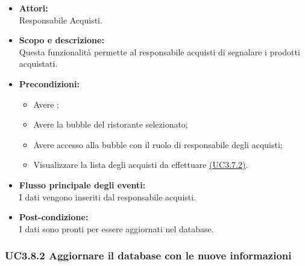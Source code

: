\begin{itemize}
	\item \textbf{Attori:}
	\\Responsabile Acquisti.
	\item \textbf{Scopo e descrizione:} 
	\\Questa funzionalità permette al responsabile acquisti di segnalare i prodotti acquistati.
	\item \textbf{Precondizioni:}
	\begin{itemize}
		\item Avere ;
		\item Avere la bubble del ristorante selezionato;
		\item Avere accesso alla bubble con il ruolo di responsabile degli acquisti;
		\item Visualizzare la lista degli acquisti da effettuare \hyperref[UC3.7.2]{(UC3.7.2)}.
	\end{itemize}
	\item \textbf{Flusso principale degli eventi:}
	\\I dati vengono inseriti dal responsabile acquisti.
	\item \textbf{Post-condizione:}
	\\I dati sono pronti per essere aggiornati nel database.
\end{itemize}

\subsubsection{UC3.8.2 Aggiornare il database con le nuove informazioni} \label{UC3.8.2}

